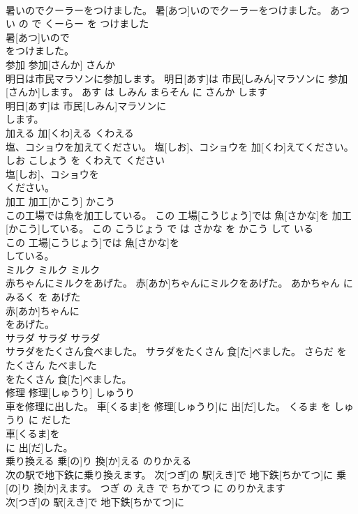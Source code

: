 \documentclass[8pt]{extreport}
\begin{document}
\begin{CJK}{UTF8}{min}
\\	暑いのでクーラーをつけました。	暑[あつ]いのでクーラーをつけました。	あつい の で くーらー を つけました	
\\	暑[あつ]いので
\\	をつけました。			
\\	参加	参加[さんか]	さんか	
\\	明日は市民マラソンに参加します。	明日[あす]は 市民[しみん]マラソンに 参加[さんか]します。	あす は しみん まらそん に さんか します	
\\	明日[あす]は 市民[しみん]マラソンに
\\	します。			
\\	加える	加[くわ]える	くわえる	
\\	塩、コショウを加えてください。	塩[しお]、コショウを 加[くわ]えてください。	しお こしょう を くわえて ください	
\\	塩[しお]、コショウを
\\	ください。			
\\	加工	加工[かこう]	かこう	
\\	この工場では魚を加工している。	この 工場[こうじょう]では 魚[さかな]を 加工[かこう]している。	この こうじょう で は さかな を かこう して いる	
\\	この 工場[こうじょう]では 魚[さかな]を
\\	している。			
\\	ミルク	ミルク	ミルク	
\\	赤ちゃんにミルクをあげた。	赤[あか]ちゃんにミルクをあげた。	あかちゃん に みるく を あげた	
\\	赤[あか]ちゃんに
\\	をあげた。			
\\	サラダ	サラダ	サラダ	
\\	サラダをたくさん食べました。	サラダをたくさん 食[た]べました。	さらだ を たくさん たべました	
\\	をたくさん 食[た]べました。			
\\	修理	修理[しゅうり]	しゅうり	
\\	車を修理に出した。	車[くるま]を 修理[しゅうり]に 出[だ]した。	くるま を しゅうり に だした	
\\	車[くるま]を
\\	に 出[だ]した。			
\\	乗り換える	乗[の]り 換[か]える	のりかえる	
\\	次の駅で地下鉄に乗り換えます。	次[つぎ]の 駅[えき]で 地下鉄[ちかてつ]に 乗[の]り 換[か]えます。	つぎ の えき で ちかてつ に のりかえます	
\\	次[つぎ]の 駅[えき]で 地下鉄[ちかてつ]に

\end{CJK}
\end{document}
